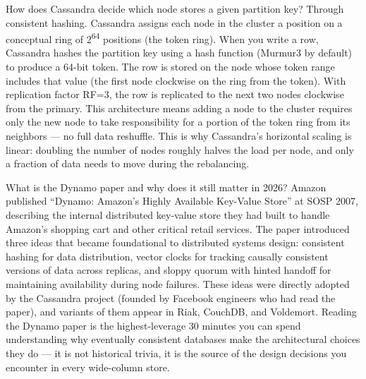 \documentclass[11pt,a4paper]{article}
\begin{document}
\begin{curiobox}{How does Cassandra decide which node stores a given partition key?}
Through consistent hashing. Cassandra assigns each node in the cluster a position on a conceptual ring of 2\textsuperscript{64} positions (the token ring). When you write a row, Cassandra hashes the partition key using a hash function (Murmur3 by default) to produce a 64-bit token. The row is stored on the node whose token range includes that value (the first node clockwise on the ring from the token). With replication factor RF=3, the row is replicated to the next two nodes clockwise from the primary. This architecture means adding a node to the cluster requires only the new node to take responsibility for a portion of the token ring from its neighbors --- no full data reshuffle. This is why Cassandra's horizontal scaling is linear: doubling the number of nodes roughly halves the load per node, and only a fraction of data needs to move during the rebalancing.
\end{curiobox}

\begin{curiobox}{What is the Dynamo paper and why does it still matter in 2026?}
Amazon published ``Dynamo: Amazon's Highly Available Key-Value Store'' at SOSP 2007, describing the internal distributed key-value store they had built to handle Amazon's shopping cart and other critical retail services. The paper introduced three ideas that became foundational to distributed systems design: consistent hashing for data distribution, vector clocks for tracking causally consistent versions of data across replicas, and sloppy quorum with hinted handoff for maintaining availability during node failures. These ideas were directly adopted by the Cassandra project (founded by Facebook engineers who had read the paper), and variants of them appear in Riak, CouchDB, and Voldemort. Reading the Dynamo paper is the highest-leverage 30 minutes you can spend understanding why eventually consistent databases make the architectural choices they do --- it is not historical trivia, it is the source of the design decisions you encounter in every wide-column store.
\end{curiobox}
\end{document}
